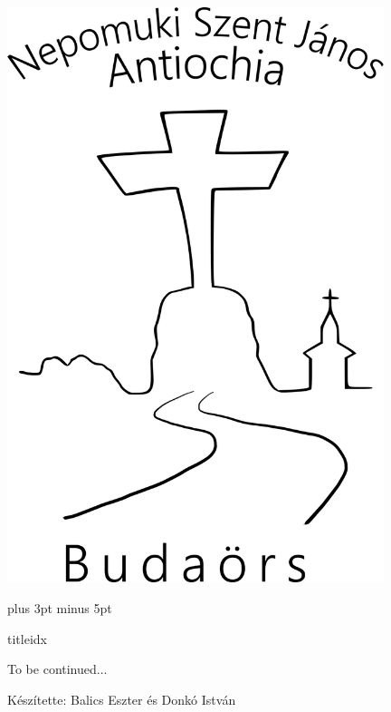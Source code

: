 \documentclass[a5paper,twoside]{article}
\author{Balics Eszter - Donkó István}
\begin{document}
  \begin{titlepage}
    \setlength{\oddsidemargin}{-1.3cm}

    \vspace*{0.75cm}
    \includegraphics[width=11cm]{Logo_07_final}
  \end{titlepage}

  \setcounter{page}{1}


  \versesep=12pt plus 3pt minus 5pt

  \begin{songs}{titleidx}
    
  \end{songs}

  To be continued...
  \vfill

  Készítette: Balics Eszter és Donkó István

\end{document}
